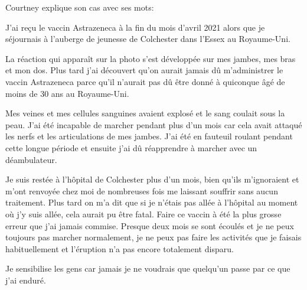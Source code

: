 Courtney explique son cas avec ses mots:

J'ai reçu le vaccin Astrazeneca à la fin du mois d'avril 2021 alors que je
séjournais à l'auberge de jeunesse de Colchester dans l'Essex au Royaume-Uni.

La réaction qui apparaît sur la photo s'est développée sur mes jambes, mes bras
et mon dos. Plus tard j'ai découvert qu'on aurait jamais dû m'administrer le
vaccin Astrazeneca parce qu'il n'aurait pas dû être donné à quiconque âgé de
moins de 30 ans au Royaume-Uni.

Mes veines et mes cellules sanguines avaient explosé et le sang coulait sous la
peau. J'ai été incapable de marcher pendant plus d'un mois car cela avait
attaqué les nerfs et les articulations de mes jambes. J'ai été en fauteuil
roulant pendant cette longue période et ensuite j'ai dû réapprendre à marcher
avec un déambulateur.

Je suis restée à l'hôpital de Colchester plus d'un mois, bien qu'ils
m'ignoraient et m'ont renvoyée chez moi de nombreuses fois me laissant souffrir
sans aucun traitement. Plus tard on m'a dit que si je n'étais pas allée à
l'hôpital au moment où j'y suis allée, cela aurait pu être fatal. Faire ce
vaccin à été la plus grosse erreur que j'ai jamais commise. Presque deux mois se
sont écoulés et je ne peux toujours pas marcher normalement, je ne peux pas
faire les activités que je faisais habituellement et l'éruption n'a pas encore
totalement disparu.

Je sensibilise les gens car jamais je ne voudrais que quelqu'un passe par ce que
j'ai enduré.

